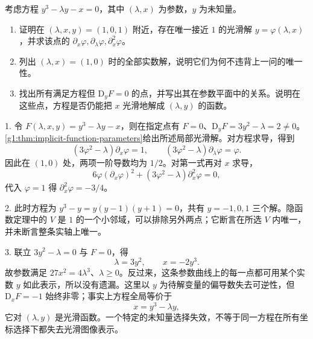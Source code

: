 \begin{exercise}
	\label{g1:ex:cubic-implicit-parameters}
	考虑方程 \(y^3-\lambda y-x=0\)，其中 \((\lambda,x)\) 为参数，\(y\) 为未知量。
	\begin{enumerate}
		\item 证明在 \((\lambda,x,y)=(1,0,1)\) 附近，存在唯一接近 \(1\) 的光滑解 \(y=\varphi(\lambda,x)\)，并求该点的 \(\partial_x\varphi,\partial_\lambda\varphi,\partial_x^2\varphi\)。
		\item 列出 \((\lambda,x)=(1,0)\) 时的全部实数解，说明它们为何不违背上一问的唯一性。
		\item 找出所有满足方程但 \(\mathrm{D}_yF=0\) 的点，并写出其在参数平面中的关系。说明在这些点，方程是否仍能把 \(x\) 光滑地解成 \((\lambda,y)\) 的函数。
	\end{enumerate}
\end{exercise}
\begin{solution}
	1. 令 \(F(\lambda,x,y)=y^3-\lambda y-x\)，则在指定点有 \(F=0\)、\(\mathrm{D}_yF=3y^2-\lambda=2\ne0\)。\cref{g1:thm:implicit-function-parameters}给出所述局部光滑解。对方程求导，得到
	\[
		(3\varphi^2-\lambda)\partial_x\varphi=1,\qquad
		(3\varphi^2-\lambda)\partial_\lambda\varphi=\varphi.
	\]
	因此在 \((1,0)\) 处，两项一阶导数均为 \(1/2\)。对第一式再对 \(x\) 求导，
	\[
		6\varphi(\partial_x\varphi)^2
		+(3\varphi^2-\lambda)\partial_x^2\varphi=0,
	\]
	代入 \(\varphi=1\) 得 \(\partial_x^2\varphi=-3/4\)。

	2. 此时方程为 \(y^3-y=y(y-1)(y+1)=0\)，共有 \(y=-1,0,1\) 三个解。隐函数定理中的 \(V\) 是 \(1\) 的一个小邻域，可以排除另外两点；它断言在所选 \(V\) 内唯一，并未断言整条实轴上唯一。

	3. 联立 \(3y^2-\lambda=0\) 与 \(F=0\)，得
	\[
		\lambda=3y^2,\qquad x=-2y^3.
	\]
	故参数满足 \(27x^2=4\lambda^3\)、\(\lambda\geq0\)。反过来，这条参数曲线上的每一点都可用某个实数 \(y\) 如此表示，所以没有遗漏。这里以 \(y\) 为待解变量的偏导数失去可逆性，但 \(\mathrm{D}_xF=-1\) 始终非零；事实上方程全局等价于
	\[
		x=y^3-\lambda y,
	\]
	它对 \((\lambda,y)\) 是光滑函数。一个特定的未知量选择失效，不等于同一方程在所有坐标选择下都失去光滑图像表示。
\end{solution}

